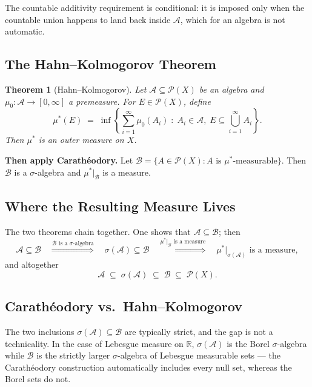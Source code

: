 \documentclass[11pt]{article}
\theoremstyle{definition}
\theoremstyle{plain}
\newtheorem{theorem}[definition]{Theorem}
\newcommand{\R}{\mathbb{R}}
\newcommand{\A}{\mathcal{A}}
\newcommand{\B}{\mathcal{B}}
\newcommand{\Pow}{\mathcal{P}}
\newcommand{\ostar}{\mu^{*}}
\begin{document}
The countable additivity requirement is conditional: it is imposed only
when the countable union happens to land back inside $\A$, which for an
algebra is not automatic.

\subsection{The Hahn--Kolmogorov Theorem}

\begin{theorem}[Hahn--Kolmogorov]
Let $\A \subseteq \Pow(X)$ be an algebra and $\mu_0 : \A \to [0,\infty]$
a premeasure. For $E \in \Pow(X)$, define
\[
  \ostar(E) \;=\;
    \inf\left\{ \sum_{i=1}^{\infty} \mu_0(A_i)
      \;:\; A_i \in \A, \; E \subseteq \bigcup_{i=1}^{\infty} A_i \right\}.
\]
Then $\ostar$ is an outer measure on $X$.
\end{theorem}

\noindent
\textbf{Then apply Carath\'eodory.} Let
$\B = \{ A \in \Pow(X) : A \text{ is } \ostar\text{-measurable} \}$.
Then $\B$ is a $\sigma$-algebra and $\ostar|_{\B}$ is a measure.

\subsection{Where the Resulting Measure Lives}

The two theorems chain together. One shows that $\A \subseteq \B$; then
\[
  \A \subseteq \B
  \quad \overset{\B \text{ is a } \sigma\text{-algebra}}{\Longrightarrow} \quad
  \sigma(\A) \subseteq \B
  \quad \overset{\ostar|_{\B} \text{ is a measure}}{\Longrightarrow} \quad
  \ostar|_{\sigma(\A)} \text{ is a measure},
\]
and altogether
\[
  \A \;\subseteq\; \sigma(\A) \;\subseteq\; \B \;\subseteq\; \Pow(X).
\]

\subsection{Carath\'eodory vs.\ Hahn--Kolmogorov}

The two inclusions $\sigma(\A) \subseteq \B$ are typically strict, and
the gap is not a technicality. In the case of Lebesgue measure on $\R$,
$\sigma(\A)$ is the Borel $\sigma$-algebra while $\B$ is the strictly
larger $\sigma$-algebra of Lebesgue measurable sets --- the
Carath\'eodory construction automatically includes every null set,
whereas the Borel sets do not.
\end{document}

